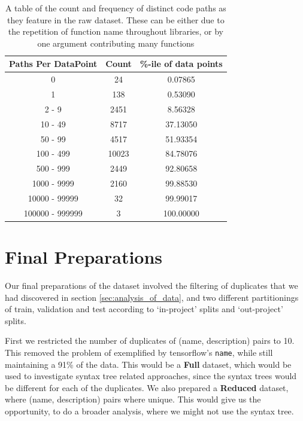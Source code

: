 \begin{table}[p]
\begin{tabular}{c | c | c  }
        Paths Per DataPoint & Count  &  \%-ile of data points \\  
        \hline
        0 &               24  &     0.07865 \\
        1 &               138  &    0.53090 \\
        2 - 9 &           2451  &   8.56328 \\
        10 - 49 &         8717  &   37.13050 \\
        50 - 99 &         4517  &   51.93354 \\
        100 - 499 &       10023  &  84.78076 \\
        500 - 999 &       2449  &   92.80658 \\
        1000 - 9999 &     2160  &   99.88530 \\
        10000 - 99999 &   32  &     99.99017 \\
        100000 - 999999 & 3  &      100.00000 \\

    \end{tabular}
    \caption { A table of the count and frequency of distinct code paths as they feature in the raw dataset. 
        These can be either due to the repetition of function name throughout libraries, or by one argument contributing many functions }
    \label{table:paths_per_point} 

\end{table}


\section{Final Preparations} %
\label{sec:final_preparations}

Our final preparations of the dataset involved the filtering of duplicates that we had discovered in section \ref{sec:analysis_of_data}, and two different partitionings of train, validation and test according to `in-project' splits and `out-project' splits.

First we restricted the number of duplicates of (name, description) pairs to 10. This removed the problem of exemplified by tensorflow's \texttt{name}, while still maintaining a 91\% of the data. This would be a \textbf{Full} dataset, which would be used to investigate syntax tree related approaches, since the syntax trees would be different for each of the duplicates.
We also prepared a \textbf{Reduced} dataset, where (name, description) pairs where unique. This would give us the opportunity, to do a broader analysis, where we might not use the syntax tree.

